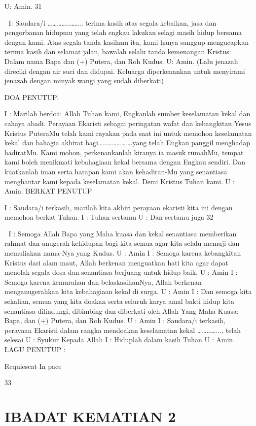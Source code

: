 \documentclass[10pt,a5paper,fancyhdr]{memoir}
\begin{document}
U: Amin. 
31 



I: Saudara/i …………..…….. terima kasih atas segala 
kebaikan, jasa dan pengorbanan hidupmu yang telah engkau lakukan 
selagi masih hidup bersama dengan kami. Atas segala tanda kasihmu 
itu, kami hanya sanggup mengucapkan terima kasih dan selamat 
jalan, bawalah selalu tanda kemenangan Kristus: Dalam nama Bapa 
dan (+) Putera, dan Roh Kudus. 
U: Amin. 
(Lalu jenazah direciki dengan air suci dan didupai. Keluarga 
diperkenankan untuk menyirami jenazah dengan minyak wangi yang 
sudah diberkati) 

DOA PENUTUP: 

I : Marilah berdoa: 
Allah Tuhan kami, Engkaulah sumber keselamatan kekal dan cahaya 
abadi. Perayaan Ekaristi sebagai peringatan wafat dan kebangkitan 
Yesus Kristus PuteraMu telah kami rayakan pada saat ini untuk 
memohon keselamatan kekal dan bahagia akhirat 
bagi………………….yang telah Engkau panggil menghadap 
hadiratMu. Kami mohon, perkenankanlah kiranya ia masuk 
rumahMu, tempat kami boleh menikmati kebahagiaan kekal bersama 
dengan Engkau sendiri. Dan kuatkanlah iman serta harapan kami 
akan kehadiran-Mu yang senantiasa menghantar kami kepada 
keselamatan kekal. Demi Kristus Tuhan kami. 
U : Amin. 
BERKAT PENUTUP 

I : Saudara/i terkasih, marilah kita akhiri perayaan ekaristi kita ini 
dengan memohon berkat Tuhan. 
I : Tuhan sertamu 
U : Dan sertamu juga 
32 



I : Semoga Allah Bapa yang Maha kuasa dan kekal senantiasa 
memberikan rahmat dan anugerah kehidupan bagi kita semua agar 
kita selalu memuji dan memuliakan nama-Nya yang Kudus. 
U : Amin 
I : Semoga karena kebangkitan Kristus dari alam maut, Allah 
berkenan menguatkan hati kita agar dapat menolak segala dosa dan 
senantiasa berjuang untuk hidup baik. 
U : Amin 
I : Semoga karena kemurahan dan belaskasihanNya, Allah berkenan 
menganugerahkan kita kebahagiaan kekal di surga. 
U : Amin 
I : Dan semoga kita sekalian, semua yang kita doakan serta seluruh 
karya amal bakti hidup kita senantiasa dilindungi, dibimbing dan 
diberkati oleh Allah Yang Maha Kuasa: Bapa, dan (+) Putera, dan 
Roh Kudus. 
U : Amin 
I : Saudara/i terkasih, perayaan Ekaristi dalam rangka mendoakan 
keselamatan kekal …………..., telah selesai 
U : Syukur Kepada Allah 
I : Hiduplah dalam kasih Tuhan 
U : Amin 
LAGU PENUTUP : 

Requiescat In pace 

33 



\chapter{IBADAT KEMATIAN 2} 
\end{document}
